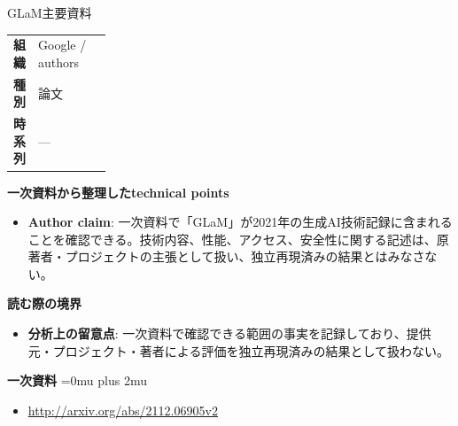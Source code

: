 \begin{technicalnote}{GLaM}{主要資料}
\begingroup
\begin{tabularx}{\linewidth}{@{}>{\bfseries}p{0.22\linewidth}X@{}}
組織 & Google / authors \\
種別 & 論文 \\
時系列 & — \\
\end{tabularx}
\smallskip
{\bfseries 一次資料から整理したtechnical points}
\begin{itemize}[leftmargin=1.5em,itemsep=0.35em]
\item \textbf{Author claim}: 一次資料で「GLaM」が2021年の生成AI技術記録に含まれることを確認できる。技術内容、性能、アクセス、安全性に関する記述は、原著者・プロジェクトの主張として扱い、独立再現済みの結果とはみなさない。
\end{itemize}
\begin{minipage}{\linewidth}
{\bfseries 読む際の境界}
\begin{itemize}[leftmargin=1.5em,itemsep=0.35em]
\item \textbf{分析上の留意点}: 一次資料で確認できる範囲の事実を記録しており、提供元・プロジェクト・著者による評価を独立再現済みの結果として扱わない。
\end{itemize}
\begin{samepage}
{\bfseries 一次資料}
\begingroup\sloppy
\Urlmuskip=0mu plus 2mu\relax
\begin{itemize}[leftmargin=1.5em,itemsep=0.25em]
\item {\scriptsize\url{http://arxiv.org/abs/2112.06905v2}}
\end{itemize}
\endgroup
\end{samepage}
\end{minipage}
\endgroup
\end{technicalnote}
\medskip

